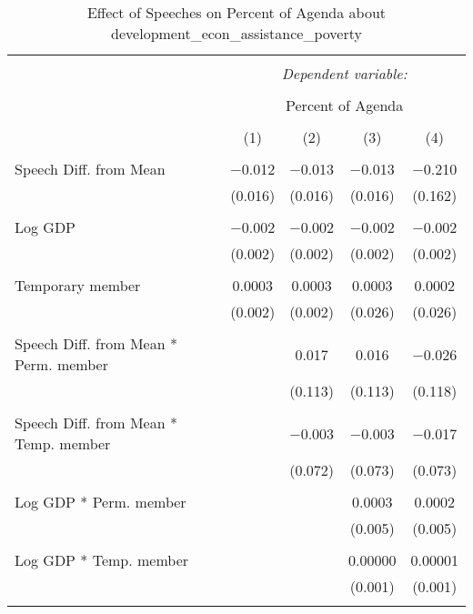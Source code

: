 
\begin{table}[!htbp] \centering 
  \caption{Effect of Speeches on Percent of Agenda about development_econ_assistance_poverty} 
  \label{} 
\begin{tabular}{@{\extracolsep{5pt}}lcccc} 
\\[-1.8ex]\hline 
\hline \\[-1.8ex] 
 & \multicolumn{4}{c}{\textit{Dependent variable:}} \\ 
\cline{2-5} 
\\[-1.8ex] & \multicolumn{4}{c}{Percent of Agenda} \\ 
\\[-1.8ex] & (1) & (2) & (3) & (4)\\ 
\hline \\[-1.8ex] 
 Speech Diff. from Mean & $-$0.012 & $-$0.013 & $-$0.013 & $-$0.210 \\ 
  & (0.016) & (0.016) & (0.016) & (0.162) \\ 
  & & & & \\ 
 Log GDP & $-$0.002 & $-$0.002 & $-$0.002 & $-$0.002 \\ 
  & (0.002) & (0.002) & (0.002) & (0.002) \\ 
  & & & & \\ 
 Temporary member & 0.0003 & 0.0003 & 0.0003 & 0.0002 \\ 
  & (0.002) & (0.002) & (0.026) & (0.026) \\ 
  & & & & \\ 
 Speech Diff. from Mean * Perm. member &  & 0.017 & 0.016 & $-$0.026 \\ 
  &  & (0.113) & (0.113) & (0.118) \\ 
  & & & & \\ 
 Speech Diff. from Mean * Temp. member &  & $-$0.003 & $-$0.003 & $-$0.017 \\ 
  &  & (0.072) & (0.073) & (0.073) \\ 
  & & & & \\ 
 Log GDP * Perm. member &  &  & 0.0003 & 0.0002 \\ 
  &  &  & (0.005) & (0.005) \\ 
  & & & & \\ 
 Log GDP * Temp. member &  &  & 0.00000 & 0.00001 \\ 
  &  &  & (0.001) & (0.001) \\ 
  & & & & \\ 

\end{tabular}
\end{table}
